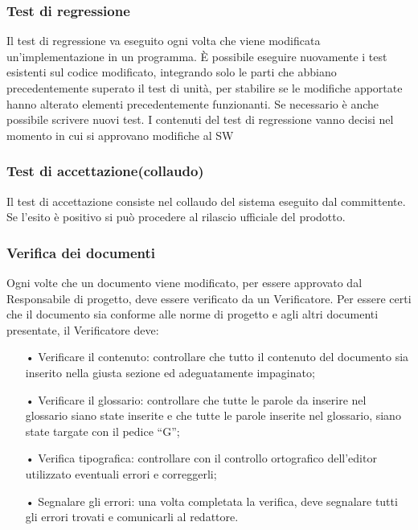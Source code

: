 \subsubsection{Test di regressione}
Il test di regressione va eseguito ogni volta che viene modificata un’implementazione in un programma. È possibile eseguire nuovamente i test esistenti sul codice modificato, integrando solo le parti che abbiano precedentemente superato il test di unità, per stabilire se le modifiche apportate hanno alterato elementi precedentemente funzionanti. Se necessario è anche possibile scrivere nuovi test. 
\newline
I contenuti del test di regressione vanno decisi nel momento in cui si approvano modifiche al SW

\subsubsection{Test di accettazione(collaudo)}
Il test di accettazione consiste nel collaudo del sistema eseguito dal committente. Se l’esito è positivo si può procedere al rilascio ufficiale del prodotto.

\subsubsection{Verifica dei documenti}
Ogni volte che un documento viene modificato, per essere approvato dal Responsabile di progetto, deve essere verificato da un Verificatore. 
\newline
Per essere certi che il documento sia conforme alle norme di progetto e agli altri documenti presentate, il Verificatore deve:
\begin{itemize}
\item[•] Verificare il contenuto: controllare che tutto il contenuto del documento sia inserito nella giusta sezione ed adeguatamente impaginato;
\item[•] Verificare il glossario: controllare che tutte le parole da inserire nel glossario siano state inserite e che tutte le parole inserite nel glossario, siano state targate con il pedice “G”;
\item[•] Verifica tipografica: controllare con il controllo ortografico dell’editor utilizzato eventuali errori e correggerli;
\item[•] Segnalare gli errori: una volta completata la verifica, deve segnalare tutti gli errori trovati e comunicarli al redattore.
\end{itemize}

